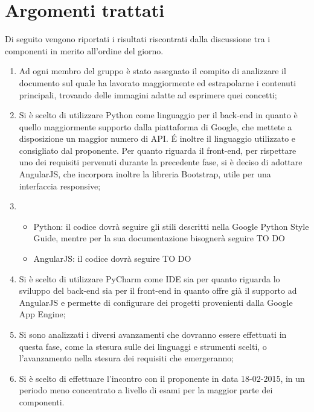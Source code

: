 %



\section{Argomenti trattati} %
\label{sec:argomenti_trattati}
Di seguito vengono riportati i risultati riscontrati dalla discussione tra i componenti in merito all'ordine del giorno.
	\begin{enumerate}
		\item Ad ogni membro del gruppo è stato assegnato il compito di analizzare il documento sul quale ha lavorato maggiormente ed estrapolarne i contenuti principali, trovando delle immagini adatte ad esprimere quei concetti;
		\item Si è scelto di utilizzare Python come linguaggio per il back-end in quanto è quello maggiormente supporto dalla piattaforma di Google, che mettete a disposizione un maggior numero di API. \'E inoltre il linguaggio utilizzato e consigliato dal proponente. \newline
		Per quanto riguarda il front-end, per rispettare uno dei requisiti pervenuti durante la precedente fase, si è deciso di adottare AngularJS, che incorpora inoltre la libreria Bootstrap, utile per una interfaccia responsive;
		\item 
			\begin{itemize}
				\item Python: il codice dovrà seguire gli stili descritti nella Google Python Style Guide, mentre per la sua documentazione bisognerà seguire TO DO 
				\item AngularJS: il codice dovrà seguire TO DO
			\end{itemize}
		\item Si è scelto di utilizzare PyCharm come IDE sia per quanto riguarda lo sviluppo del back-end sia per il front-end in quanto offre già il supporto ad AngularJS e permette di configurare dei progetti provenienti dalla Google App Engine;
		\item Si sono analizzati i diversi avanzamenti che dovranno essere effettuati in questa fase, come la stesura sulle \docNameVersionNdp{} dei linguaggi e strumenti scelti, o l'avanzamento nella stesura dei requisiti che emergeranno;
		\item Si è scelto di effettuare l'incontro con il proponente in data 18-02-2015, in un periodo meno concentrato a livello di esami per la maggior parte dei componenti.
	\end{enumerate}
